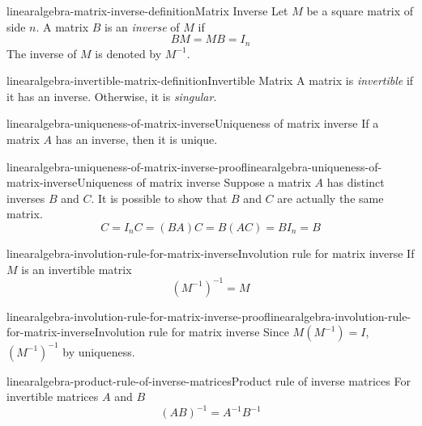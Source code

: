 \documentclass[preview]{standalone}
\begin{document}
\begin{snippetdefinition}{linearalgebra-matrix-inverse-definition}{Matrix Inverse}
    Let \(M\) be a square matrix of side \(n\).
    A matrix \(B\) is an \textit{inverse}
    of \(M\) if \[BM=MB=I_n\]
    The inverse of \(M\) is denoted by \(M^{-1}\).
\end{snippetdefinition}

\begin{snippetdefinition}{linearalgebra-invertible-matrix-definition}{Invertible Matrix}
    A matrix is \textit{invertible} if it has an inverse.
    Otherwise, it is \textit{singular}.
\end{snippetdefinition}

\begin{snippetproposition}{linearalgebra-uniqueness-of-matrix-inverse}{Uniqueness of matrix inverse}
    If a matrix \(A\) has an inverse, then it is unique.
\end{snippetproposition}

\begin{snippetproof}{linearalgebra-uniqueness-of-matrix-inverse-proof}{linearalgebra-uniqueness-of-matrix-inverse}{Uniqueness of matrix inverse}
    Suppose a matrix \(A\) has distinct inverses \(B\)
    and \(C\).
    It is possible to show that \(B\) and \(C\) are actually
    the same matrix.
    \[
        C=I_n C = (BA) C = B (AC) = BI_n = B
    \]
\end{snippetproof}

\begin{snippetproposition}{linearalgebra-involution-rule-for-matrix-inverse}{Involution rule for matrix inverse}
    If \(M\) is an invertible matrix
    \[
        {(M^{-1})}^{-1} = M
    \]
\end{snippetproposition}

\begin{snippetproof}{linearalgebra-involution-rule-for-matrix-inverse-proof}{linearalgebra-involution-rule-for-matrix-inverse}{Involution rule for matrix inverse}
    Since \(M(M^{-1}) = I\), \({(M^{-1})}^{-1}\)
    by uniqueness. %
\end{snippetproof}

\begin{snippetproposition}{linearalgebra-product-rule-of-inverse-matrices}{Product rule of inverse matrices}
    For invertible matrices \(A\) and \(B\)
    \[
        {(AB)}^{-1} = A^{-1} B^{-1}
    \]
\end{snippetproposition}
\end{document}

